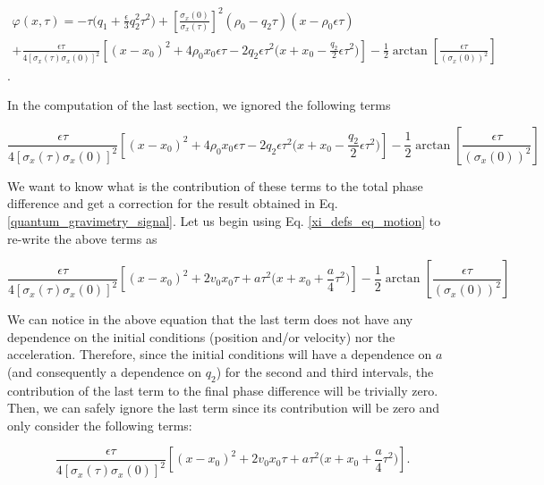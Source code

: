 \documentclass{article}
\begin{document}
\begin{multline*}\label{quantum_phase_revisited}
\varphi(x, \tau) = -\tau \bigg(q_{1} + \frac{\epsilon}{3} q_{2}^{2} \tau^{2}\bigg) + \left[\frac{\sigma_{x}(0)}{\sigma_{x}(\tau)} \right]^{2} (\rho_{0} - q_{2} \tau)(x-\rho_{0} \epsilon \tau) \\
+ \frac{\epsilon \tau}{4 [\sigma_{x}(\tau)\sigma_{x}(0)]^{2}} \left[(x-x_{0})^{2} + 4\rho_{0} x_{0} \epsilon \tau -2q_{2} \epsilon \tau^{2} \bigg(x+x_{0}- \frac{q_{2}}{2} \epsilon \tau^{2} \bigg)\right] 
- \frac{1}{2}\arctan\left[\frac{\epsilon \tau}{(\sigma_{x}(0))^{2}}\right]
\end{multline*}.

In the computation of the last section, we ignored the following terms

\begin{equation*}
\frac{\epsilon \tau}{4 [\sigma_{x}(\tau)\sigma_{x}(0)]^{2}} \left[(x-x_{0})^{2} + 4\rho_{0} x_{0} \epsilon \tau -2q_{2} \epsilon \tau^{2} \bigg(x+x_{0}- \frac{q_{2}}{2} \epsilon \tau^{2} \bigg)\right] 
- \frac{1}{2}\arctan\left[\frac{\epsilon \tau}{(\sigma_{x}(0))^{2}}\right]
\end{equation*}

We want to know what is the contribution of these terms to the total phase difference and get a correction for the result obtained in Eq. \ref{quantum_gravimetry_signal}. Let us begin using Eq. \ref{xi_defs_eq_motion} to re-write the above terms as 

\begin{equation}\label{quantum_phase_ignored_terms}
\frac{\epsilon \tau}{4 [\sigma_{x}(\tau)\sigma_{x}(0)]^{2}} \left[(x-x_{0})^{2} + 2v_{0} x_{0} \tau +a \tau^{2} \bigg(x+x_{0}+ \frac{a}{4} \tau^{2} \bigg)\right] 
- \frac{1}{2}\arctan\left[\frac{\epsilon \tau}{(\sigma_{x}(0))^{2}}\right]
\end{equation}

We can notice in the above equation that the last term does not have any dependence on the initial conditions (position and/or velocity) nor the acceleration. Therefore, since the initial conditions will have a dependence on $a$ (and consequently a dependence on $q_{2}$) for the second and third intervals, the contribution of the last term to the final phase difference will be trivially zero. Then, we can safely ignore the last term since its contribution will be zero and only consider the following terms:

\begin{equation}\label{quantum_phase_ignored_terms_simplified}
\frac{\epsilon \tau}{4 [\sigma_{x}(\tau)\sigma_{x}(0)]^{2}} \left[(x-x_{0})^{2} + 2v_{0} x_{0} \tau +a \tau^{2} \bigg(x+x_{0}+ \frac{a}{4} \tau^{2} \bigg)\right].
\end{equation}
\end{document}
